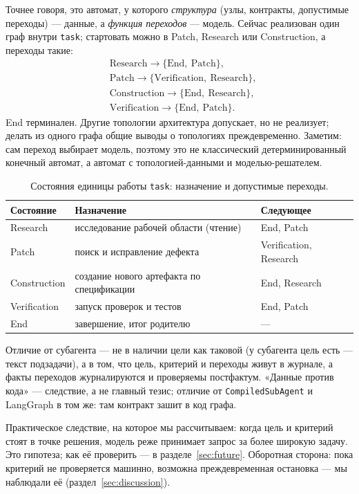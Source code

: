 \documentclass[11pt,a4paper]{article}
\begin{document}
Точнее говоря, это автомат, у которого \emph{структура} (узлы, контракты, допустимые
переходы) --- данные, а \emph{функция переходов} --- модель. Сейчас реализован один граф
внутри \texttt{task}; стартовать можно в Patch, Research или Construction, а переходы такие:
\[
\begin{aligned}
&\text{Research} \rightarrow \{\text{End},\ \text{Patch}\}, \\
&\text{Patch} \rightarrow \{\text{Verification},\ \text{Research}\}, \\
&\text{Construction} \rightarrow \{\text{End},\ \text{Research}\}, \\
&\text{Verification} \rightarrow \{\text{End},\ \text{Patch}\}.
\end{aligned}
\]
End терминален. Другие топологии архитектура допускает, но не реализует; делать из одного
графа общие выводы о топологиях преждевременно. Заметим: сам переход выбирает модель, поэтому
это не классический детерминированный конечный автомат, а автомат с топологией-данными и
моделью-решателем.

\begin{table}[h]
\centering
\small
\caption{Состояния единицы работы \texttt{task}: назначение и допустимые переходы.}
\label{tab:states}
\begin{tabular}{@{}lll@{}}
\toprule
Состояние & Назначение & Следующее \\
\midrule
Research & исследование рабочей области (чтение) & End, Patch \\
Patch & поиск и исправление дефекта & Verification, Research \\
Construction & создание нового артефакта по спецификации & End, Research \\
Verification & запуск проверок и тестов & End, Patch \\
End & завершение, итог родителю & --- \\
\bottomrule
\end{tabular}
\end{table}

Отличие от субагента --- не в наличии цели как таковой (у субагента цель есть --- текст
подзадачи), а в том, что цель, критерий и переходы живут в журнале, а факты переходов
журналируются и проверяемы постфактум. «Данные против кода» --- следствие, а не главный
тезис; отличие от \texttt{CompiledSubAgent} и LangGraph в том же: там контракт зашит в код
графа.

Практическое следствие, на которое мы рассчитываем: когда цель и критерий стоят в точке
решения, модель реже принимает запрос за более широкую задачу. Это гипотеза; как её проверить ---
в разделе~\ref{sec:future}. Оборотная сторона: пока критерий не проверяется машинно,
возможна преждевременная остановка --- мы наблюдали её (раздел~\ref{sec:discussion}).
\end{document}
